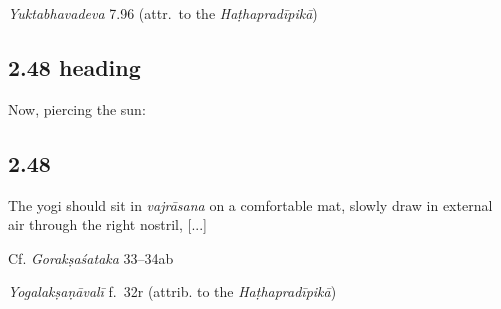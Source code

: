 \begin{ekdosis}
\begin{testimonia}[hp02_047]
\emph{Yuktabhavadeva} 7.96 (attr.~to the \emph{Haṭhapradīpikā})

\begin{versinnote}
\end{versinnote}
\end{testimonia}


\subsection*{2.48 heading}
\begin{translation}[hp02_048a]
Now, piercing the sun:
\end{translation}


\subsection*{2.48}
\begin{translation}[hp02_048]
The yogi should sit in \emph{vajrāsana} on a comfortable mat, slowly draw in external air through the right nostril, [...]
\end{translation}

\begin{sources}[hp02_048]
Cf. \emph{Gorakṣaśataka} 33–34ab
\begin{versinnote}
\end{versinnote} 
\end{sources}

\begin{testimonia}[hp02_048]
\emph{Yogalakṣaṇāvalī} f.~32r (attrib. to the \emph{Haṭhapradīpikā})
\begin{versinnote}
\end{versinnote}


\end{testimonia}
\end{ekdosis}
